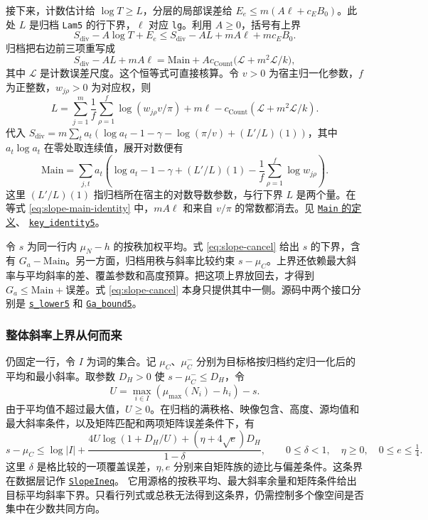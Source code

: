 \documentclass[UTF8,fontset=none,a4paper,11pt]{ctexart}
\theoremstyle{definition}
\newcommand{\src}[3]{\href{https://github.com/leanprover-community/riemann-hypothesis/blob/23aebbb302010b292314d406aa97f7901d698634/src/#1.lean\#L#2}{#3}}
\begin{document}
接下来，计数估计给 $\log T\ge L$，分层的局部误差给 $E_e\le m(A\ell+c_E B_0)$。此处 $L$ 是归档 \texttt{Lam5} 的行下界，$\ell$ 对应 \texttt{lg}。利用 $A\ge0$，括号有上界
\[
 S_{\mathrm{div}}-A\log T+E_e
 \le S_{\mathrm{div}}-AL+mA\ell+mc_E B_0 .
\]
归档把右边前三项重写成
\begin{equation}\label{eq:slope-main-identity}
 S_{\mathrm{div}}-AL+mA\ell
 =\mathrm{Main}+A c_{\mathrm{Count}}\bigl(\mathcal L+m^2\mathcal L/k\bigr),
\end{equation}
其中 $\mathcal L$ 是计数误差尺度。这个恒等式可直接核算。令 $v>0$ 为宿主归一化参数，$f$ 为正整数，$w_{j\rho}>0$ 为对应权，则
\[
 L=\sum_{j=1}^m\frac1f\sum_{\rho=1}^f\log(w_{j\rho}v/\pi)
       +m\ell-c_{\mathrm{Count}}(\mathcal L+m^2\mathcal L/k).
\]
代入 $S_{\mathrm{div}}=m\sum_t a_t(\log a_t-1-\gamma-\log(\pi/v)+(L'/L)(1))$，其中 $a_t\log a_t$ 在零处取连续值，展开对数便有
\[
 \mathrm{Main}
 =\sum_{j,t}a_t\left(\log a_t-1-\gamma+(L'/L)(1)
                  -\frac1f\sum_{\rho=1}^f\log w_{j\rho}\right).
\]
这里 $(L'/L)(1)$ 指归档所在宿主的对数导数参数，与行下界 $L$ 是两个量。在等式 \eqref{eq:slope-main-identity} 中，$mA\ell$ 和来自 $v/\pi$ 的常数都消去。见
\src{Formalism/RankGapBounds/MeanBoundSecondForm}{107}{\texttt{Main} 的定义}、
\src{Formalism/SizeWindowBrackets/ChainSlopeWindows/LevelOfCongruence}{105}{\texttt{key\_identity5}}。

令 $s$ 为同一行内 $\mu_N-h$ 的按秩加权平均。式 \eqref{eq:slope-cancel} 给出 $s$ 的下界，含有 $G_a-\mathrm{Main}$。另一方面，归档用秩与斜率比较约束 $s-\mu_C$。上界还依赖最大斜率与平均斜率的差、覆盖参数和高度预算。把这项上界放回去，才得到 $G_a\le\mathrm{Main}+\text{误差}$。式 \eqref{eq:slope-cancel} 本身只提供其中一侧。源码中两个接口分别是
\src{Formalism/SizeWindowBrackets/ChainSlopeWindows/LevelOfCongruence}{50}{\texttt{s\_lower5}}
和
\src{Formalism/SizeWindowBrackets/ChainSlopeWindows/LevelOfCongruence}{113}{\texttt{Ga\_bound5}}。

\subsubsection{整体斜率上界从何而来}
仍固定一行，令 $I$ 为词的集合。记 $\mu_C$、$\mu_C^-$ 分别为目标格按归档约定归一化后的平均和最小斜率。取参数 $D_H>0$ 使 $s-\mu_C^-\le D_H$，令
\[
 U=\max_{i\in I}(\mu_{\max}(N_i)-h_i)-s .
\]
由于平均值不超过最大值，$U\ge0$。在归档的满秩格、映像包含、高度、源均值和最大斜率条件，以及矩阵匹配和两项矩阵误差条件下，有
\begin{equation}\label{eq:rank-entropy}
 s-\mu_C\le \log |I|+
 \frac{4U\log(1+D_H/U)+(\eta+4\sqrt e)D_H}{1-\delta},
 \qquad 0\le\delta<1,\quad \eta\ge0,\quad 0\le e\le\tfrac14 .
\end{equation}
这里 $\delta$ 是格比较的一项覆盖误差，$\eta,e$ 分别来自矩阵族的迹比与偏差条件。这条界在数据层记作
\src{Formalism/RankGapBounds/MeanBoundSecondForm}{151}{\texttt{SlopeIneq}}。
它用源格的按秩平均、最大斜率余量和矩阵条件给出目标平均斜率下界。只看行列式或总秩无法得到这条界，仍需控制多个像空间是否集中在少数共同方向。
\end{document}
